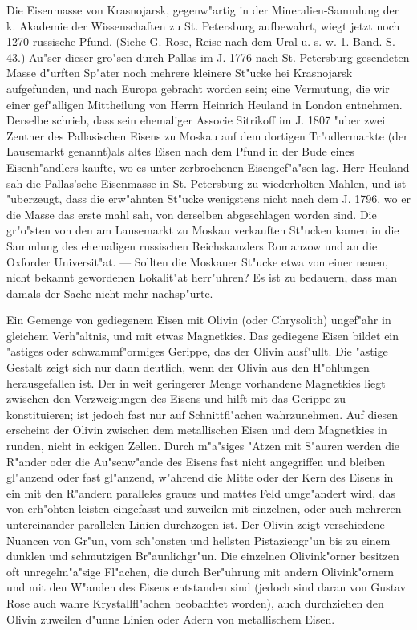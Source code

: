 \documentclass[a4paper, 11pt, oneside, polutonikogreek, german]{article}
\begin{document}
{\footnotesize Die Eisenmasse von Krasnojarsk, gegenw"artig in der Mineralien-Sammlung der k. Akademie der Wissenschaften zu St. Petersburg aufbewahrt, wiegt jetzt noch 1270 russische Pfund. (Siehe G. Rose, Reise nach dem Ural u. s. w. 1. Band. S. 43.) Au"ser dieser gro"sen durch Pallas im J. 1776 nach St. Petersburg gesendeten Masse d"urften Sp"ater noch mehrere kleinere St"ucke hei Krasnojarsk aufgefunden, und nach Europa gebracht worden sein; eine Vermutung, die wir einer gef"alligen Mittheilung von Herrn Heinrich Heuland in London entnehmen. Derselbe schrieb, dass sein ehemaliger Associe Sitrikoff im J. 1807 "uber zwei Zentner des Pallasischen Eisens zu Moskau auf dem dortigen Tr"odlermarkte (der Lausemarkt genannt)als altes Eisen nach dem Pfund in der Bude eines Eisenh"andlers kaufte, wo es unter zerbrochenen Eisengef"a"sen lag. Herr Heuland sah die Pallas'sche Eisenmasse in St. Petersburg zu wiederholten Mahlen, und ist "uberzeugt, dass die erw"ahnten St"ucke wenigstens nicht nach dem J. 1796, wo er die Masse das erste mahl sah, von derselben abgeschlagen worden sind. Die gr"o"sten von den am Lausemarkt zu Moskau verkauften St"ucken kamen in die Sammlung des ehemaligen russischen Reichskanzlers Romanzow und an die Oxforder Universit"at. --- Sollten die Moskauer St"ucke etwa von einer neuen, nicht bekannt gewordenen Lokalit"at herr"uhren? Es ist zu bedauern, dass man damals der Sache nicht mehr nachsp"urte.}

\setlength{\leftskip}{0pt}
\setlength{\parindent}{20pt}

Ein Gemenge von gediegenem Eisen mit Olivin (oder Chrysolith) ungef"ahr in gleichem Verh"altnis, und mit etwas Magnetkies. Das gediegene Eisen bildet ein "astiges oder schwammf"ormiges Gerippe, das der Olivin ausf"ullt. Die "astige Gestalt zeigt sich nur dann deutlich, wenn der Olivin aus den H"ohlungen herausgefallen ist. Der in weit geringerer Menge vorhandene Magnetkies liegt zwischen den Verzweigungen des Eisens und hilft mit das Gerippe zu konstituieren; ist jedoch fast nur auf Schnittfl"achen wahrzunehmen. Auf diesen erscheint der Olivin zwischen dem metallischen Eisen und dem Magnetkies in runden, nicht in eckigen Zellen. Durch m"a"siges "Atzen mit S"auren werden die R"ander oder die Au"senw"ande des Eisens fast nicht angegriffen und bleiben gl"anzend oder fast gl"anzend, w"ahrend die Mitte oder der Kern des Eisens in ein mit den R"andern paralleles graues und mattes Feld umge"andert wird, das von erh"ohten leisten eingefasst und zuweilen mit einzelnen, oder auch mehreren untereinander parallelen Linien durchzogen ist. Der Olivin zeigt verschiedene Nuancen von Gr"un, vom sch"onsten und hellsten Pistaziengr"un bis zu einem dunklen und schmutzigen Br"aunlichgr"un. Die einzelnen Olivink"orner besitzen oft unregelm"a"sige Fl"achen, die durch Ber"uhrung mit andern Olivink"ornern und mit den W"anden des Eisens entstanden sind (jedoch sind daran von Gustav Rose auch wahre Krystallfl"achen beobachtet worden), auch durchziehen den Olivin zuweilen d"unne Linien oder Adern von metallischem Eisen.
\end{document}

